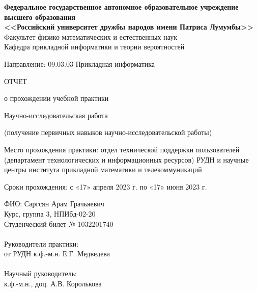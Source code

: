 \begin{titlepage}
  
  \begin{center}
    \textbf{%
      Федеральное государственное автономное образовательное
      учреждение высшего образования\\
      <<Российский университет дружбы народов имени Патриса Лумумбы>>}\\[5mm]
    Факультет физико-математических и естественных наук \\[2mm]
    Кафедра прикладной информатики и теории вероятностей

    \vfill

    
    
    \vfill

    Направление: 09.03.03 Прикладная информатика

    \vfill

    ОТЧЕТ

    \bigskip
    
    о прохождении учебной практики

    Научно-исследовательская работа
    
    (получение первичных навыков научно-исследовательской работы)

    \medskip
    
    Место прохождения практики: отдел технической поддержки
    пользователей (департамент технологических и информационных
    ресурсов) РУДН и научные центры института прикладной математики
    и телекоммуникаций
   
    Сроки прохождения: с «17» апреля 2023 г. по «17» июня 2023 г.
  \end{center}

\vfill

  \begin{minipage}{.45\textwidth}
    ФИО: Саргсян Арам Грачьяевич\\
    Курс, группа 3, НПИбд-02-20\\
    Студенческий билет № 1032201740 \\ \\
    Руководители практики: \\
    от РУДН к.ф.-м.н. Е.Г. Медведева \\ \\
    
    Научный руководитель: \\
    к.ф.-м.н., доц. А.В. Королькова \\ \\


\end{minipage}
\end{titlepage}
